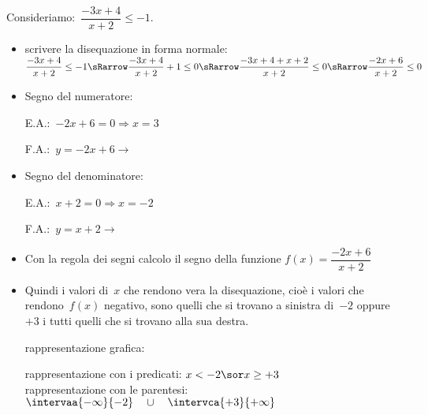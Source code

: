  \begin{esempio}
Consideriamo:~\(\dfrac{-3 x +4}{x+2} \le -1\).
\begin{itemize} [noitemsep]
 \item scrivere la disequazione in forma normale:\\ [.5em]
 \(\dfrac{-3 x +4}{x+2} \le -1 \sRarrow \dfrac{-3 x +4}{x+2} +1 \le 0 
\sRarrow
 \dfrac{-3 x +4 + x +2}{x+2} \le 0 \sRarrow \dfrac{-2 x +6}{x+2} \le 0\)\\
 \item Segno del numeratore:\\
 \begin{minipage}{.45\textwidth}
  E.A.:~\(-2 x +6=0 \Rightarrow x=3\)
 \end{minipage}
 \begin{minipage}{.25\textwidth}
  F.A.:~\(y=-2 x +6 \rightarrow \)
 \end{minipage}
 \begin{minipage}{.3\textwidth}
 \end{minipage}
 \item Segno del denominatore:\\
 \begin{minipage}{.45\textwidth}
  E.A.:~\(x + 2=0 \Rightarrow x=-2\)
 \end{minipage}
 \begin{minipage}{.25\textwidth}
  F.A.:~\(y=x +2 \rightarrow \)
 \end{minipage}
 \begin{minipage}{.3\textwidth}
 \end{minipage}
 \item Con la regola dei segni calcolo il segno della funzione 
 \(f(x) = \dfrac{-2 x +6}{x+2}\) 

  \segnofratta
 \item Quindi i valori di~\(x\) che rendono vera la disequazione, cioè i valori
  che rendono~\(f(x)\) negativo, sono quelli 
  che si trovano a sinistra di~\(-2\) oppure \(+3\) i tutti quelli che si 
trovano alla sua destra. 
 \subitem 
  \begin{minipage}{.35\textwidth}
   rappresentazione grafica: 
  \end{minipage}
  \begin{minipage}{.30\textwidth}
  \end{minipage}
 \subitem rappresentazione con i predicati: \quad \(x < -2 \sor x \ge +3\) \\
 \subitem rappresentazione con le 
  parentesi: \quad \(\intervaa{-\infty}{-2} \quad \cup \quad 
                     \intervca{+3}{+\infty}\) 
\end{itemize}
 \end{esempio}


